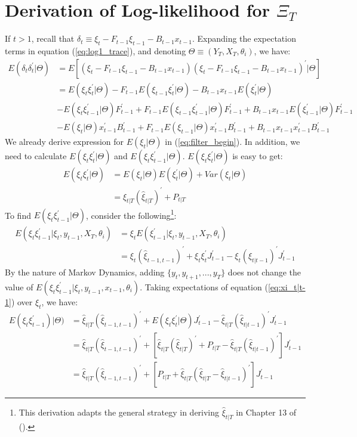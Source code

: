 \documentclass[12pt]{article}
\numberwithin{equation}{section}
\begin{document}
\section{Derivation of Log-likelihood for $\Xi_T$} \label{ap:log}
If $t>1$, recall that $\delta_t \equiv \xi_t - F_{t-1}\xi_{t-1} - B_{t-1}x_{t-1}$. Expanding the expectation terms in equation (\ref{eq:log1_trace}), and denoting $\Theta \equiv (Y_T,X_T, \theta_i)$, we have:
\begin{align*}
    E(\delta_t\delta_t^{'}|\Theta) &= E[(\xi_t-F_{t-1}\xi_{t-1}-B_{t-1}x_{t-1}) 
    (\xi_t-F_{t-1}\xi_{t-1}-B_{t-1}x_{t-1})^{'}|\Theta] \\
    &= E(\xi_t\xi_t^{'}|\Theta) - F_{t-1}E(\xi_{t-1}\xi_{t}^{'}|\Theta) - B_{t-1}x_{t-1}E(\xi_t^{'}|\Theta) \\
    &- E(\xi_t\xi_{t-1}^{'}|\Theta)F_{t-1}^{'} + F_{t-1}E(\xi_{t-1}\xi_{t-1}^{'}|\Theta)F_{t-1}^{'}
    +B_{t-1}x_{t-1}E(\xi_{t-1}^{'}|\Theta)F_{t-1}^{'} \\
    &- E(\xi_t|\Theta)x_{t-1}^{'}B_{t-1}^{'} + F_{t-1}E(\xi_{t-1}|\Theta)x_{t-1}^{'}B_{t-1}^{'}
    +B_{t-1}x_{t-1}x_{t-1}^{'}B_{t-1}^{'}
\end{align*}
We already derive expression for $E(\xi_t|\Theta)$ in (\ref{eq:filter_begin}). In addition, we need to calculate $E(\xi_t\xi_t^{'}|\Theta)$ and $E(\xi_t\xi_{t-1}^{'}|\Theta)$. $E(\xi_t\xi_t^{'}|\Theta)$ is easy to  get:
\begin{align*}
    E(\xi_t\xi_t^{'}|\Theta) & = E(\xi_t|\Theta)E(\xi_t^{'}|\Theta) + Var(\xi_t|\Theta) \\
    &= \hat{\xi}_{t|T}(\hat{\xi}_{t|T})^{'} + P_{t|T}
\end{align*}
To find $E(\xi_t\xi_{t-1}^{'}|\Theta)$, consider the following\footnote{This derivation adapts the general strategy in deriving $\hat{\xi}_{t|T}$ in Chapter 13 of (\cite{hamilton_1994}).}:
\begin{align}
    E(\xi_t\xi_{t-1}^{'}|\xi_t,y_{t-1},X_T,\theta_i) &= \xi_tE(\xi_{t-1}^{'}|\xi_t,y_{t-1},X_T,\theta_i) \nonumber \\
    &= \xi_t(\hat{\xi}_{t-1,t-1})^{'} + \xi_t\xi_t^{'}J_{t-1}^{'} - \xi_{t}(\hat{\xi}_{t|t-1})^{'}J_{t-1}^{'} \label{eq:xi_t|t-1}
\end{align}
By the nature of Markov Dynamics, adding $\{y_t, y_{t+1}, ..., y_T\}$ does not change the value of $E(\xi_t\xi_{t-1}^{'}|\xi_t,y_{t-1},x_{t-1},\theta_i)$. Taking expectations of equation (\ref{eq:xi_t|t-1}) over $\xi_t$, we have:
\begin{align*}
    E(\xi_t\xi_{t-1}^{'})|\Theta) &= \hat{\xi}_{t|T}(\hat{\xi}_{t-1,t-1})^{'} + E(\xi_t\xi_t^{'}|\Theta)J_{t-1}^{'}
    -\hat{\xi}_{t|T}(\hat{\xi}_{t|t-1})^{'}J_{t-1}^{'} \\
    &= \hat{\xi}_{t|T}(\hat{\xi}_{t-1,t-1})^{'} + [\hat{\xi}_{t|T}(\hat{\xi}_{t|T})^{'} + P_{t|T} 
    -\hat{\xi}_{t|T}(\hat{\xi}_{t|t-1})^{'}]J_{t-1}^{'} \\
    &= \hat{\xi}_{t|T}(\hat{\xi}_{t-1,t-1})^{'} + [P_{t|T} + \hat{\xi}_{t|T}(\hat{\xi}_{t|T}-\hat{\xi}_{t|t-1})^{'}]J_{t-1}^{'}
\end{align*}
\end{document}
